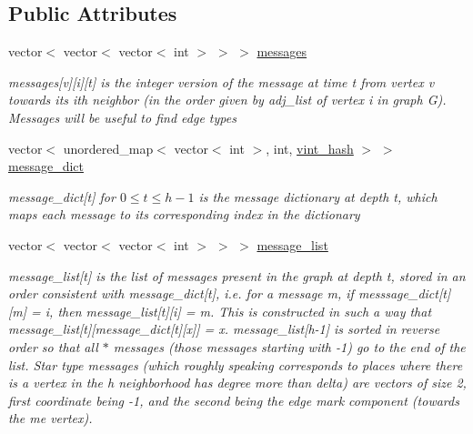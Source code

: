 \subsection*{Public Attributes}
\begin{DoxyCompactItemize}
\item 
vector$<$ vector$<$ vector$<$ int $>$ $>$ $>$ \hyperlink{classgraph__message_aac77e098f0acf9650116a8e51fe3b4b7}{messages}
\begin{DoxyCompactList}\small\item\em messages\mbox{[}v\mbox{]}\mbox{[}i\mbox{]}\mbox{[}t\mbox{]} is the integer version of the message at time t from vertex v towards its ith neighbor (in the order given by adj\+\_\+list of vertex i in graph G). Messages will be useful to find edge types \end{DoxyCompactList}\item 
vector$<$ unordered\+\_\+map$<$ vector$<$ int $>$, int, \hyperlink{structvint__hash}{vint\+\_\+hash} $>$ $>$ \hyperlink{classgraph__message_ab54d89b122c2b1322da0d5db2043fb84}{message\+\_\+dict}
\begin{DoxyCompactList}\small\item\em message\+\_\+dict\mbox{[}t\mbox{]} for $0 \leq t \leq h-1$ is the message dictionary at depth t, which maps each message to its corresponding index in the dictionary \end{DoxyCompactList}\item 
vector$<$ vector$<$ vector$<$ int $>$ $>$ $>$ \hyperlink{classgraph__message_aa17fdb629b423343edfafa97252763ef}{message\+\_\+list}
\begin{DoxyCompactList}\small\item\em message\+\_\+list\mbox{[}t\mbox{]} is the list of messages present in the graph at depth t, stored in an order consistent with message\+\_\+dict\mbox{[}t\mbox{]}, i.\+e. for a message m, if messsage\+\_\+dict\mbox{[}t\mbox{]}\mbox{[}m\mbox{]} = i, then message\+\_\+list\mbox{[}t\mbox{]}\mbox{[}i\mbox{]} = m. This is constructed in such a way that message\+\_\+list\mbox{[}t\mbox{]}\mbox{[}message\+\_\+dict\mbox{[}t\mbox{]}\mbox{[}x\mbox{]}\mbox{]} = x. message\+\_\+list\mbox{[}h-\/1\mbox{]} is sorted in reverse order so that all $\ast$ messages (those messages starting with -\/1) go to the end of the list. Star type messages (which roughly speaking corresponds to places where there is a vertex in the h neighborhood has degree more than delta) are vectors of size 2, first coordinate being -\/1, and the second being the edge mark component (towards the \textquotesingle{}me\textquotesingle{} vertex). \end{DoxyCompactList}\item 

\end{DoxyCompactItemize}
